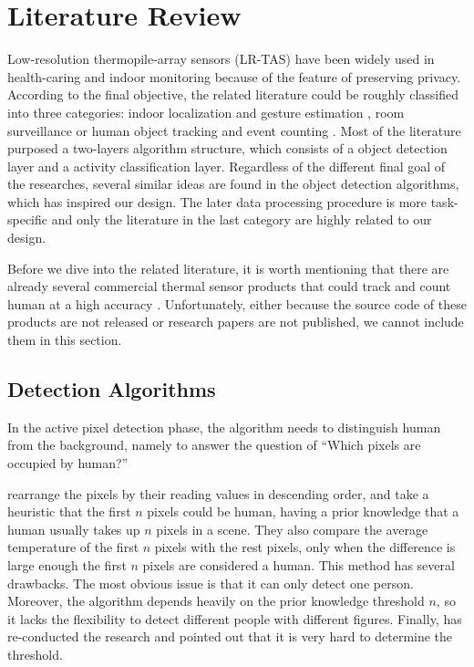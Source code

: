 \chapter{Literature Review} \label{ch:review}
Low-resolution thermopile-array sensors (LR-TAS) have been widely used in health-caring and indoor monitoring because of the feature of preserving privacy. According to the final objective, the related literature could be roughly classified into three categories: indoor localization and gesture estimation \cite{multi,karayaneva2018use,jeong2014probabilistic},
room surveillance \cite{gonzalez2013using,thermosense,basu2015tracking,IRTAS16x4}
or human object tracking and event counting \cite{mika,firstflow,melexis,virtualtrack}.
Most of the literature purposed a two-layers algorithm structure, which consists of a object detection layer and a activity classification layer. Regardless of the different final goal of the researches, several similar ideas are found in the object detection algorithms, which has inspired our design. The later data processing procedure is more task-specific and only the literature in the last category are highly related to our design.

Before we dive into the related literature, it is worth mentioning that there are already several commercial thermal sensor products that could track and count human at a high accuracy \cite{irisys,flir}. Unfortunately, either because the source code of these products are not released or research papers are not published, we cannot include them in this section.

\section{Detection Algorithms}
In the active pixel detection phase, the algorithm needs to distinguish human from the background, namely to answer the question of ``Which pixels are occupied by human?''

\citeauthor{mashiyama2015activity} \cite{mashiyama2015activity} rearrange the pixels by their reading values in descending order, and take a heuristic that the first $n$ pixels could be human, having a prior knowledge that a human usually takes up $n$ pixels in a scene. They also compare the average temperature of the first $n$ pixels with the rest pixels, only when the difference is large enough the first $n$ pixels are considered a human. This method has several drawbacks. The most obvious issue is that it can only detect one person. Moreover, the algorithm depends heavily on the prior knowledge threshold $n$, so it lacks the flexibility to detect different people with different figures. Finally, \citeauthor{trofimova2017indoor} \cite{trofimova2017indoor} has re-conducted the research and pointed out that it is very hard to determine the threshold.

